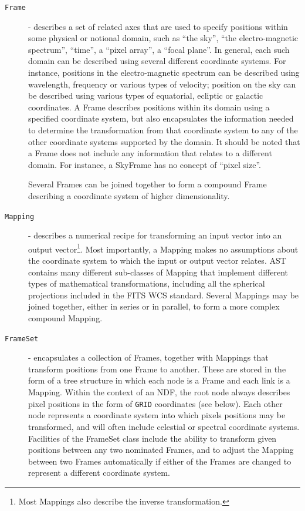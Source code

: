 \documentclass[final,authoryear,5p,times,twocolumn]{elsarticle}
\begin{document}
\begin{description}

\item[\texttt{Frame}] - describes a set of related axes that are used to
specify positions within some physical or notional domain, such as ``the
sky'', ``the electro-magnetic spectrum'', ``time'', a ``pixel array'', a
``focal plane''. In general, each such domain can be described using
several different coordinate systems. For instance, positions in the
electro-magnetic spectrum can be described using wavelength, frequency or
various types of velocity; position on the sky can be described using
various types of equatorial, ecliptic or galactic coordinates. A Frame
describes positions within its domain using a specified coordinate
system, but also encapsulates the information needed to determine the
transformation from that coordinate system to any of the other
coordinate systems supported by the domain. It should be noted that a
Frame does not include any information that relates to a different
domain. For instance, a SkyFrame has no concept of ``pixel size''.

Several Frames can be joined together to form a compound Frame describing
a coordinate system of higher dimensionality.

\item[\texttt{Mapping}] -  describes a numerical recipe for transforming
an input vector into an output vector\footnote{Most Mappings also describe the
inverse transformation.}. Most importantly, a Mapping makes
no assumptions about the coordinate system to which the input or output
vector relates. AST contains many different sub-classes of Mapping that
implement different types of mathematical transformations, including all
the spherical projections included in the FITS WCS standard. Several
Mappings may be joined together, either in series or in parallel, to form
a more complex compound Mapping.

\item[\texttt{FrameSet}] - encapsulates a collection of Frames, together
with Mappings that transform positions from one Frame to another. These
are stored in the form of a tree structure in which each node is a Frame
and each link is a Mapping. Within the context of an NDF, the root node
always describes pixel positions in the form of \texttt{GRID} coordinates (see
below). Each other node represents a coordinate system into which pixels
positions may be transformed, and will often include celestial or
spectral coordinate systems. Facilities of the FrameSet class include the
ability to transform given positions between any two nominated Frames, and
to adjust the Mapping between two Frames automatically if either of the
Frames are changed to represent a different coordinate system.

\end{description}
\end{document}
